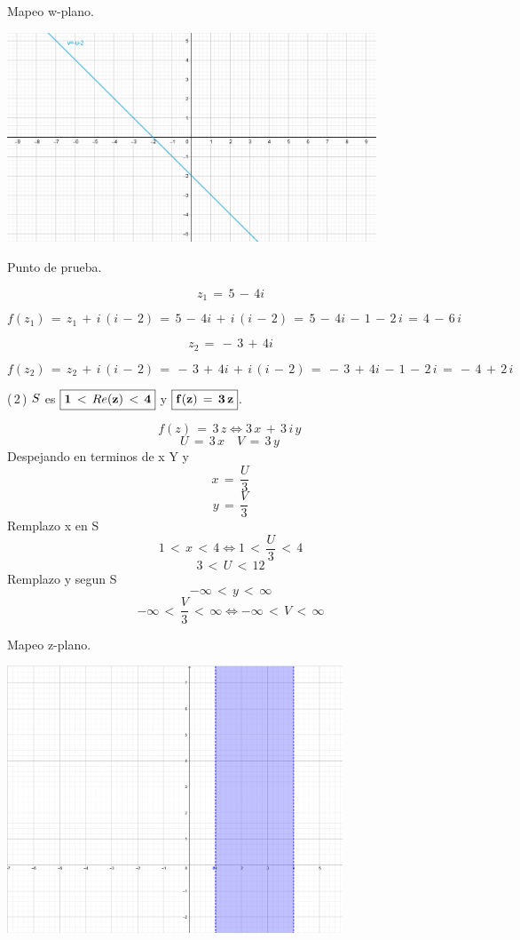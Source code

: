 \documentclass[a4paper,11pt,openany]{book}
\begin{document}
\textcolor{ao(english)}{} Mapeo w-plano.

\begin{center}
     \includegraphics[width=11cm]{Mapeo Ej 1 w.png}
\end{center}

\textcolor{ao(english)}{} Punto de prueba.

$$z_{1}\,=\,5\,-\,4i$$

$$f(z_{1})\,=\,z_{1}\,+\,i\,(i\,-\,2)\,=\,5\,-\,4i\,+\,i\,(i\,-\,2)\,=\,5\,-\,4i\,-\,1\,-\,2\,i\,=\,4\,-\,6\,i$$


$$z_{2}\,=\,-\,3\,+\,4i$$

$$f(z_{2})\,=\,z_{2}\,+\,i\,(i\,-\,2)\,=\,-\,3\,+\,4i\,+\,i\,(i\,-\,2)\,=\,-\,3\,+\,4i\,-\,1\,-\,2\,i\,=\,-\,4\,+\,2\,i$$

\textcolor{ao(english)}{(\,2\,)} $\mathnormal{S}$ es $\boxed{\bf{1\,<\,\mathnormal{Re}(z)\,<\,4}}$ y $\boxed{\bf{f(z)\,=\,3\,z}}$.

$$f(z)\,=\,3\,z \iff 3\,x\,+\,3\,i\,y\, $$
$$ U\,=\,3\,x \quad V\,=\,3\,y\, $$
Despejando en terminos de x Y y
$$ x\,=\,\dfrac{U}{3} $$
$$ y\,=\,\dfrac{V}{3} $$
Remplazo x en S
$$ 1\,<\,x\,<\,4 \iff 1\,<\,\dfrac{U}{3}\,<\,4 $$
$$ 3\,<\,U\,<\,12 $$
Remplazo y segun S
$$ -\infty\,<\,y\,<\,\infty $$
$$ -\infty\,<\,\dfrac{V }{3}\,<\,\infty \iff -\infty\,<\,V\,<\,\infty$$

\newpage

\textcolor{ao(english)}{} Mapeo z-plano.

\begin{center}
     \includegraphics[width=10cm]{Mapeo-Ej-2-z}
\end{center}
\end{document}
